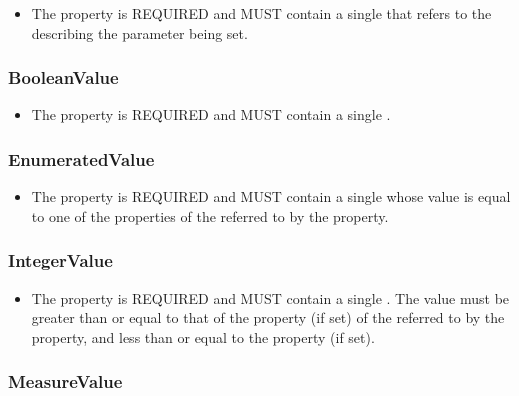 \begin{itemize}
\item \label{sec:valueOf}
The  property is REQUIRED and MUST contain a single  that refers to the  describing the parameter being set.
\end{itemize}


\subsubsection{BooleanValue}
\label{sec:BooleanValue}

\begin{itemize}
\item \label{sec:BP:value}
The  property is REQUIRED and MUST contain a single .
\end{itemize}

\subsubsection{EnumeratedValue}
\label{sec:EnumeratedValue}

\begin{itemize}
\item \label{sec:EV:value}
The  property is REQUIRED and MUST contain a single  whose value is equal to one of the  properties of the  referred to by the  property.
\end{itemize}


\subsubsection{IntegerValue}
\label{sec:IntegerValue}

\begin{itemize}
\item \label{sec:IV:value}
The  property is REQUIRED and MUST contain a single .
The value must be greater than or equal to that of the  property (if set) of the  referred to by the  property, and less than or equal to the  property (if set).
\end{itemize}

\subsubsection{MeasureValue}
\label{sec:MeasureValue}

